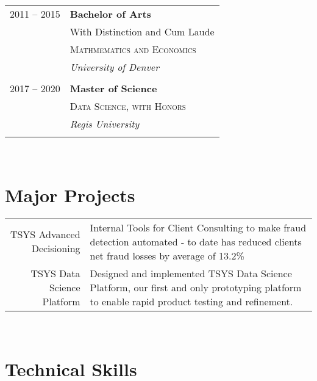 \documentclass[10pt]{article} %
\begin{document}
\begin{minipage}[t]{0.44\textwidth}
\begin{tabular}{rl}

2011 -- 2015  & \textbf{Bachelor of Arts} \\ 
& \small{With Distinction and Cum Laude}\\
& \textsc{Mathmematics and Economics} \\ 
& \textit{University of Denver}\\
&\\
2017 -- 2020  & \textbf{Master of Science} \\ 
& \textsc{Data Science, with Honors} \\ 
& \textit{Regis University}\\
&\\	 


\end{tabular}\\[10pt]






\section{Major Projects}
\begin{tabular}{rl}
\parbox{0.35\textwidth}{TSYS Advanced Decisioning} & \parbox{0.5\textwidth}{Internal Tools for Client Consulting to make fraud detection automated - to date has reduced clients net fraud losses by average of 13.2\%}\\
\parbox{0.35\textwidth}{TSYS Data Science Platform} & \parbox{0.5\textwidth}{Designed and implemented TSYS Data Science Platform, our first and only prototyping platform to enable rapid product testing and refinement.  }\\
\end{tabular}\\[10pt]

\section{Technical Skills} 


\end{minipage}
\end{document}

